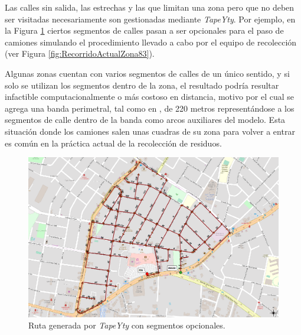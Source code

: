 Las calles sin salida, las estrechas y las que limitan una zona pero que no deben ser visitadas necesariamente son gestionadas mediante \textit{TapeYty}. Por ejemplo, en la Figura \ref{fig:RecorridoTapeYtyZona83Opcionales} ciertos segmentos de calles pasan a ser opcionales para el paso de camiones simulando el procedimiento llevado a cabo por el equipo de recolección (ver Figura \ref{fig:RecorridoActualZona83}).


Algunas zonas cuentan con varios segmentos de calles de un único sentido, y si solo se utilizan los segmentos dentro de la zona, el resultado podría resultar infactible computacionalmente o más costoso en distancia, motivo por el cual se agrega una banda perimetral, tal como en \citet{Braier2017AnArgentina}, de 220 metros representándose a los segmentos de calle dentro de la banda como arcos auxiliares del modelo. Esta situación donde los camiones salen unas cuadras de su zona para volver a entrar es común en la práctica actual de la recolección de residuos.

\begin{figure}[htbp]
    \centering
    \includegraphics[width=\textwidth]{recorrido83Opcionales.png}
    \caption{Ruta generada por \textit{TapeYty} con segmentos opcionales.}
    \label{fig:RecorridoTapeYtyZona83Opcionales}
\end{figure}

